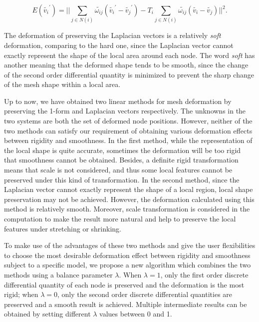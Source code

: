 \begin{equation}
\label{eq:edgelapenergy}
E(\tilde{v_i}^\prime)=||\sum\limits_{j\in N(i)}{\tilde{\omega_{ij}}(\tilde{v_i}^\prime - \tilde{v_j}^\prime)} -T_i\sum\limits_{j\in N(i)}{\tilde{\omega_{ij}}(\tilde{v_i} - \tilde{v_j})}||^2.
\end{equation}

The deformation of preserving the Laplacian vectors  is a relatively
\textit{soft} deformation, comparing to the hard one, since the
Laplacian vector cannot exactly represent the shape of the local
area around each node. The word \textit{soft} has another meaning
that the deformed shape tends to be smooth, since the change of the
second order differential quantity is minimized to prevent the sharp
change of the mesh shape within a local area.

Up to now, we have obtained two linear methods for  mesh deformation
by preserving the 1-form and Laplacian vectors respectively. The
unknowns in the two systems are both the set of deformed node
positions. However, neither of the two methods can satisfy our
requirement of obtaining various deformation effects between
rigidity and smoothness. In the first method, while the
representation of the local shape is quite accurate, sometimes the
deformation will be too rigid that smoothness cannot be obtained.
Besides, a definite rigid transformation means that scale is not
considered, and thus some local features cannot be preserved under
this kind of transformation. In the second method, since the
Laplacian vector cannot exactly represent the shape of a local
region, local shape preservation may not be achieved. However, the
deformation calculated using this method is relatively smooth.
Moreover, scale transformation is considered in the computation to
make the result more natural and help to preserve the local features
under stretching or shrinking.

To make use of the advantages of these two methods and  give the
user flexibilities to choose the most desirable deformation effect
between rigidity and smoothness subject to a specific model, we
propose a new algorithm which combines the two methods using a
balance parameter $\lambda$. When $\lambda=1$, only the first order
discrete differential quantity of each node is preserved and the
deformation is the most rigid; when $\lambda=0$, only the second
order discrete differential quantities are preserved and a smooth
result is achieved. Multiple intermediate results can be obtained by
setting different $\lambda$ values between 0 and 1.

